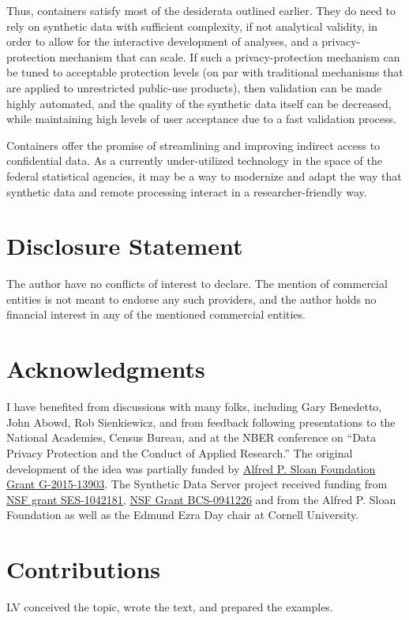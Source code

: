 \documentclass[12pt]{article}
\begin{document}
Thus, containers satisfy most of the desiderata outlined earlier. They do need to rely on synthetic data with sufficient complexity, if not analytical validity, in order to allow for the interactive development of analyses, and a privacy-protection mechanism that can scale. If such a privacy-protection mechanism can be tuned to acceptable protection levels (on par with traditional mechanisms that are applied to unrestricted public-use products), then validation can be made highly automated, and the quality of the synthetic data itself can be decreased, while maintaining high levels of user acceptance due to a fast validation process.

Containers offer the promise of streamlining and improving indirect access to confidential data. As a currently under-utilized technology in the space of the federal statistical agencies, it may be a way to modernize and adapt the way that synthetic data and remote processing interact in a researcher-friendly way.























\section*{Disclosure Statement}
The author have no conflicts of interest to declare. The mention of commercial entities is not meant to endorse any such providers, and the author holds no financial interest in any of the mentioned commercial entities.

\section*{Acknowledgments}

I have benefited from discussions with many folks, including Gary Benedetto, John Abowd, Rob Sienkiewicz, and from feedback following presentations to the National Academies, Census Bureau, and at the NBER conference on ``Data Privacy Protection and the Conduct of Applied Research.'' The original development of the idea was partially funded by \href{https://sloan.org/grant-detail/6845}{Alfred P. Sloan Foundation Grant G-2015-13903}. The Synthetic Data Server project received funding from \href{https://www.nsf.gov/awardsearch/showAward?AWD_ID=1042181}{NSF grant SES-1042181}, \href{https://www.nsf.gov/awardsearch/showAward?AWD_ID=0941226}{NSF Grant BCS-0941226} and from the Alfred P. Sloan Foundation as well as the  Edmund Ezra Day chair at Cornell University.

\section*{Contributions}

LV conceived the topic, wrote the text, and prepared the examples.







\end{document}
